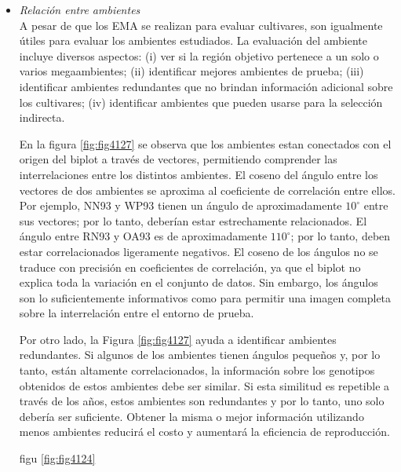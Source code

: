 \begin{itemize}[wide, nosep, labelindent = 0pt, topsep = 1ex, noitemsep,topsep=0pt]
\item \emph{Relación entre ambientes}\\

A pesar de que los EMA se realizan para evaluar cultivares, son igualmente útiles para evaluar los ambientes estudiados. La evaluación del ambiente incluye diversos aspectos: (i) ver si la región objetivo pertenece a un solo o varios megaambientes; (ii) identificar mejores ambientes de prueba; (iii) identificar ambientes redundantes que no brindan información adicional sobre los cultivares; (iv) identificar ambientes que pueden usarse para la selección indirecta.

En la figura \ref{fig:fig4127} se observa que los ambientes estan conectados con el origen del biplot a través de vectores, permitiendo comprender las interrelaciones entre los distintos ambientes. El coseno del ángulo entre los vectores de dos ambientes se aproxima al coeficiente de correlación entre ellos. Por ejemplo, NN93 y WP93 tienen un ángulo de aproximadamente $10^{\circ}$ entre sus vectores; por lo tanto, deberían estar estrechamente relacionados. El ángulo entre RN93 y OA93 es de aproximadamente $110^{\circ}$; por lo tanto, deben estar correlacionados ligeramente negativos. El coseno de los ángulos no se traduce con precisión en coeficientes de correlación, ya que el biplot no explica toda la variación en el conjunto de datos. Sin embargo, los ángulos son lo suficientemente informativos como para permitir una imagen completa sobre la interrelación entre el entorno de prueba.

Por otro lado, la Figura \ref{fig:fig4127} ayuda a identificar ambientes redundantes. Si algunos de los ambientes tienen ángulos pequeños y, por lo tanto, están altamente correlacionados, la información sobre los genotipos obtenidos de estos ambientes debe ser similar. Si esta similitud es repetible a través de los años, estos ambientes son redundantes y por lo tanto, uno solo debería ser suficiente. Obtener la misma o mejor información utilizando menos ambientes reducirá el costo y aumentará la eficiencia de reproducción.



figu \ref{fig:fig4124}


\end{itemize}

